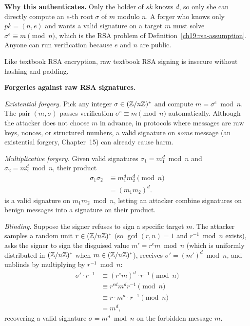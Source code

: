 \begin{whybox}
\textbf{Why this authenticates.} Only the holder of $sk$ knows $d$, so only she can directly compute an $e$-th root $\sigma$ of $m$ modulo $n$. A forger who knows only $pk=(n,e)$ and wants a valid signature on a target $m$ must solve $\sigma^e \equiv m \pmod n$, which is the RSA problem of Definition~\ref{ch19:rsa-assumption}. Anyone can run verification because $e$ and $n$ are public.
\end{whybox}

Like textbook RSA encryption, raw textbook RSA signing is insecure without hashing and padding.

\begin{attackbox}
\textbf{Forgeries against raw RSA signatures.}

\emph{Existential forgery.} Pick any integer $\sigma \in (\mathbb{Z}/n\mathbb{Z})^{*}$ and compute $m = \sigma^e\bmod n$. The pair $(m,\sigma)$ passes verification $\sigma^e \equiv m \pmod n$ automatically. Although the attacker does not choose $m$ in advance, in protocols where messages are raw keys, nonces, or structured numbers, a valid signature on \emph{some} message (an existential forgery, Chapter~15) can already cause harm.

\emph{Multiplicative forgery.} Given valid signatures $\sigma_1 = m_1^d \bmod n$ and $\sigma_2 = m_2^d \bmod n$, their product
\begin{align*}
  \sigma_1\sigma_2 &\equiv m_1^d m_2^d \pmod n \\
                   &= (m_1 m_2)^d.
\end{align*}
is a valid signature on $m_1 m_2 \bmod n$, letting an attacker combine signatures on benign messages into a signature on their product.

\emph{Blinding.} Suppose the signer refuses to sign a specific target $m$. The attacker samples a random unit $r \in (\mathbb{Z}/n\mathbb{Z})^{*}$ (so $\gcd(r,n)=1$ and $r^{-1} \bmod n$ exists), asks the signer to sign the disguised value $m' = r^e m\bmod n$ (which is uniformly distributed in $(\mathbb{Z}/n\mathbb{Z})^{*}$ when $m \in (\mathbb{Z}/n\mathbb{Z})^{*}$), receives $\sigma' = (m')^d \bmod n$, and unblinds by multiplying by $r^{-1} \bmod n$:
\begin{align*}
  \sigma' \cdot r^{-1} &\equiv (r^e m)^d \cdot r^{-1} \pmod n \\
                       &\equiv r^{ed} m^d r^{-1} \pmod n \\
                       &\equiv r \cdot m^d \cdot r^{-1} \pmod n \\
                       &= m^d,
\end{align*}
recovering a valid signature $\sigma = m^d \bmod n$ on the forbidden message $m$.
\end{attackbox}


